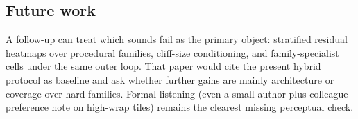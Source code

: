 \subsection{Future work}
\label{sec:outlook}

A follow-up can treat which sounds fail as the primary object: stratified residual heatmaps over procedural families, cliff-size conditioning, and family-specialist cells under the same outer loop.
That paper would cite the present hybrid protocol as baseline and ask whether further gains are mainly architecture or coverage over hard families.
Formal listening (even a small author-plus-colleague preference note on high-wrap tiles) remains the clearest missing perceptual check.

